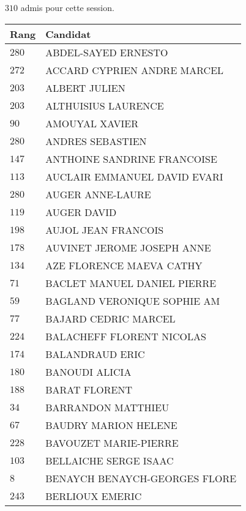 



  $310$ admis pour cette session.

  \begin{xltabular}{\linewidth}{|l|X|}
    \hline
    \textbf{Rang} & \textbf{Candidat} \\
    \hline
    $280$ & ABDEL-SAYED ERNESTO \\
    \hline
    $272$ & ACCARD CYPRIEN ANDRE MARCEL \\
    \hline
    $203$ & ALBERT JULIEN \\
    \hline
    $203$ & ALTHUISIUS LAURENCE \\
    \hline
    $90$ & AMOUYAL XAVIER \\
    \hline
    $280$ & ANDRES SEBASTIEN \\
    \hline
    $147$ & ANTHOINE SANDRINE FRANCOISE \\
    \hline
    $113$ & AUCLAIR EMMANUEL DAVID EVARI \\
    \hline
    $280$ & AUGER ANNE-LAURE \\
    \hline
    $119$ & AUGER DAVID \\
    \hline
    $198$ & AUJOL JEAN FRANCOIS \\
    \hline
    $178$ & AUVINET JEROME JOSEPH ANNE \\
    \hline
    $134$ & AZE FLORENCE MAEVA CATHY \\
    \hline
    $71$ & BACLET MANUEL DANIEL PIERRE \\
    \hline
    $59$ & BAGLAND VERONIQUE SOPHIE AM \\
    \hline
    $77$ & BAJARD CEDRIC MARCEL \\
    \hline
    $224$ & BALACHEFF FLORENT NICOLAS \\
    \hline
    $174$ & BALANDRAUD ERIC \\
    \hline
    $180$ & BANOUDI ALICIA \\
    \hline
    $188$ & BARAT FLORENT \\
    \hline
    $34$ & BARRANDON MATTHIEU \\
    \hline
    $67$ & BAUDRY MARION HELENE \\
    \hline
    $228$ & BAVOUZET MARIE-PIERRE \\
    \hline
    $103$ & BELLAICHE SERGE ISAAC \\
    \hline
    $8$ & BENAYCH BENAYCH-GEORGES FLORE \\
    \hline
    $243$ & BERLIOUX EMERIC \\

\end{xltabular}
